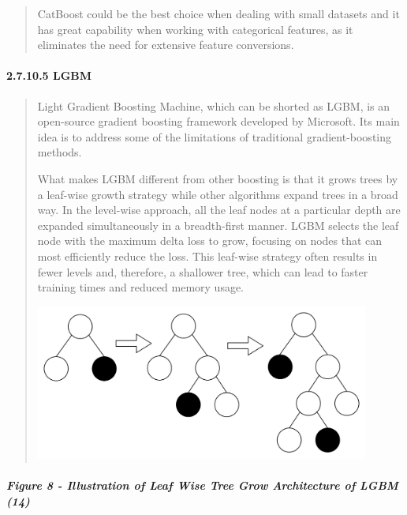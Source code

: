 \documentclass[
]{article}
\begin{document}
\begin{quote}
CatBoost could be the best choice when dealing with small datasets and
it has great capability when working with categorical features, as it
eliminates the need for extensive feature conversions.
\end{quote}

\hypertarget{lgbm}{%
\paragraph{\texorpdfstring{\textbf{2.7.10.5
LGBM}}{2.7.10.5 LGBM}}\label{lgbm}}

\begin{quote}
Light Gradient Boosting Machine, which can be shorted as LGBM, is an
open-source gradient boosting framework developed by Microsoft. Its main
idea is to address some of the limitations of traditional
gradient-boosting methods.

What makes LGBM different from other boosting is that it grows trees by
a leaf-wise growth strategy while other algorithms expand trees in a
broad way. In the level-wise approach, all the leaf nodes at a
particular depth are expanded simultaneously in a breadth-first manner.
LGBM selects the leaf node with the maximum delta loss to grow, focusing
on nodes that can most efficiently reduce the loss. This leaf-wise
strategy often results in fewer levels and, therefore, a shallower tree,
which can lead to faster training times and reduced memory usage.

\includegraphics[width=4.32292in,height=2.01611in]{vertopal_f239f640fefe43bb8bc0698cafd57825/media/image9.png}
\end{quote}

\hypertarget{figure-8---illustration-of-leaf-wise-tree-grow-architecture-of-lgbm-14}{%
\subparagraph{\texorpdfstring{\textbf{Figure 8} - Illustration of Leaf
Wise Tree Grow Architecture of LGBM
(14)}{Figure 8 - Illustration of Leaf Wise Tree Grow Architecture of LGBM (14)}}\label{figure-8---illustration-of-leaf-wise-tree-grow-architecture-of-lgbm-14}}
\end{document}
